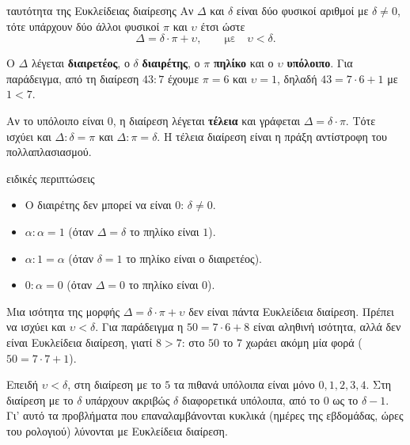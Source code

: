 
\begin{kanonas}{ταυτότητα της Ευκλείδειας διαίρεσης}
Αν $\Delta$ και $\delta$ είναι δύο φυσικοί αριθμοί με $\delta\neq 0$, τότε υπάρχουν δύο άλλοι φυσικοί $\pi$ και $\upsilon$ έτσι ώστε
$$\Delta=\delta\cdot\pi+\upsilon,\qquad\text{με}\quad \upsilon<\delta.$$
\end{kanonas}

Ο $\Delta$ λέγεται \textbf{διαιρετέος}, ο $\delta$ \textbf{διαιρέτης}, ο $\pi$ \textbf{πηλίκο} και ο $\upsilon$ \textbf{υπόλοιπο}. Για παράδειγμα, από τη διαίρεση $43:7$ έχουμε $\pi=6$ και $\upsilon=1$, δηλαδή $43=7\cdot 6+1$ με $1<7$.

Αν το υπόλοιπο είναι $0$, η διαίρεση λέγεται \textbf{τέλεια} και γράφεται $\Delta=\delta\cdot\pi$. Τότε ισχύει και $\Delta:\delta=\pi$ και $\Delta:\pi=\delta$. Η τέλεια διαίρεση είναι η πράξη αντίστροφη του πολλαπλασιασμού.

\begin{idiotita}{ειδικές περιπτώσεις}
\begin{itemize}[leftmargin=1.2em,itemsep=0.3ex,topsep=2pt]
\item Ο διαιρέτης δεν μπορεί να είναι $0$: $\delta\neq 0$.
\item $\alpha:\alpha=1$ (όταν $\Delta=\delta$ το πηλίκο είναι $1$).
\item $\alpha:1=\alpha$ (όταν $\delta=1$ το πηλίκο είναι ο διαιρετέος).
\item $0:\alpha=0$ (όταν $\Delta=0$ το πηλίκο είναι $0$).
\end{itemize}
\end{idiotita}

\begin{prosoxi}
Μια ισότητα της μορφής $\Delta=\delta\cdot\pi+\upsilon$ δεν είναι πάντα Ευκλείδεια διαίρεση. Πρέπει να ισχύει και $\upsilon<\delta$. Για παράδειγμα η $50=7\cdot 6+8$ είναι αληθινή ισότητα, αλλά δεν είναι Ευκλείδεια διαίρεση, γιατί $8>7$: στο $50$ το $7$ χωράει ακόμη μία φορά ($50=7\cdot 7+1$).
\end{prosoxi}


Επειδή $\upsilon<\delta$, στη διαίρεση με το $5$ τα πιθανά υπόλοιπα είναι μόνο $0,1,2,3,4$. Στη διαίρεση με το $\delta$ υπάρχουν ακριβώς $\delta$ διαφορετικά υπόλοιπα, από το $0$ ως το $\delta-1$. Γι' αυτό τα προβλήματα που επαναλαμβάνονται κυκλικά (ημέρες της εβδομάδας, ώρες του ρολογιού) λύνονται με Ευκλείδεια διαίρεση.

